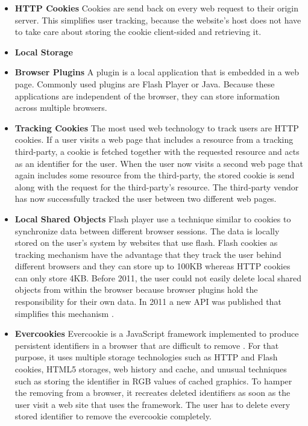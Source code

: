 	
	
	\begin{itemize}
		\item \textbf{HTTP Cookies} Cookies are send back on every web request to their origin server. This simplifies user tracking, because the website's host does not have to take care about storing the cookie client-sided and retrieving it. 
		
		\item \textbf{Local Storage} 
		
		\item \textbf{Browser Plugins} A plugin is a local application that is embedded in a web page. Commonly used plugins are Flash Player or Java. Because these applications are independent of the browser, they can store information across multiple browsers. 
	\end{itemize}
	
	\begin{itemize}
		\item \textbf{Tracking Cookies} The most used web technology to track users are HTTP cookies. If a user visits a web page that includes a resource from a tracking third-party, a cookie is fetched together with the requested resource and acts as an identifier for the user. When the user now visits a second web page that again includes some resource from the third-party, the stored cookie is send along with the request for the third-party's resource. The third-party vendor has now successfully tracked the user between two different web pages.  
		
		\item \textbf{Local Shared Objects} Flash player use a technique similar to cookies to synchronize data between different browser sessions. The data is locally stored on the user's system by websites that use flash. Flash cookies as tracking mechanism have the advantage that they track the user behind different browsers and they can store up to 100KB whereas HTTP cookies can only store 4KB. Before 2011, the user could not easily delete local shared objects from within the browser because browser plugins hold the responsibility for their own data. In 2011 a new API was published that simplifies this mechanism \cite{mozillaWikiClearPrivacyAPI}. %
		
		\item \textbf{Evercookies} Evercookie is a JavaScript framework implemented to produce persistent identifiers in a browser that are difficult to remove \cite{evercookie}. For that purpose, it uses multiple storage technologies such as HTTP and Flash cookies, HTML5 storages, web history and cache, and unusual techniques such as storing the identifier in RGB values of cached graphics. To hamper the removing from a browser, it recreates deleted identifiers as soon as the user visit a web site that uses the framework. The user has to delete every stored identifier to remove the evercookie completely. 
	\end{itemize}
	
